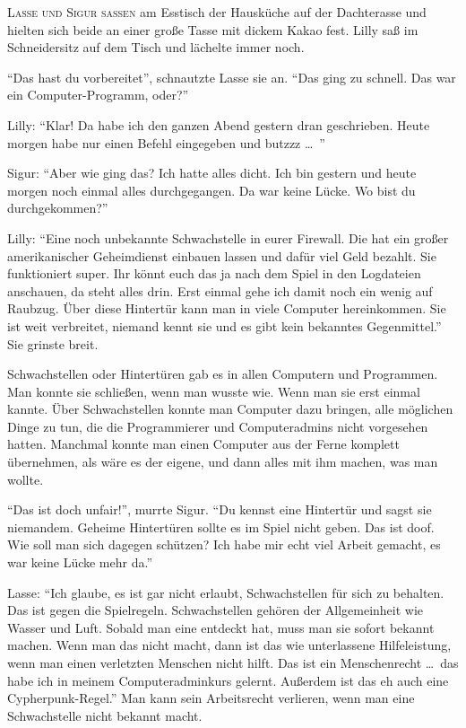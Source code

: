 \label{cha:schwachstellen_in_computern}

\textsc{Lasse und Sigur saßen} am Esstisch der Hausküche auf der Dachterasse und hielten sich beide an einer große Tasse mit dickem Kakao fest.
Lilly saß im Schneidersitz auf dem Tisch und lächelte immer noch.

\enquote{Das hast du vorbereitet}, schnautzte Lasse sie an.
\enquote{Das ging zu schnell.
Das war ein Computer-Programm, oder?}

Lilly: \enquote{Klar! Da habe ich den ganzen Abend gestern dran geschrieben.
Heute morgen habe nur einen Befehl eingegeben und butzzz \dots\ }

Sigur: \enquote{Aber wie ging das?
Ich hatte alles dicht.
Ich bin gestern und heute morgen noch einmal alles durchgegangen.
Da war keine Lücke.
Wo bist du durchgekommen?}

Lilly: \enquote{Eine noch unbekannte Schwachstelle in eurer Firewall.
Die hat ein großer amerikanischer Geheimdienst einbauen lassen und dafür viel Geld bezahlt.
Sie funktioniert super.
Ihr könnt euch das ja nach dem Spiel in den Logdateien anschauen, da steht alles drin.
Erst einmal gehe ich damit noch ein wenig auf Raubzug.
Über diese Hintertür kann man in viele Computer hereinkommen.
Sie ist weit verbreitet, niemand kennt sie und es gibt kein bekanntes Gegenmittel.}
Sie grinste breit.

Schwachstellen oder Hintertüren gab es in allen Computern und Programmen.
Man konnte sie schließen, wenn man wusste wie.
Wenn man sie erst einmal kannte.
Über Schwachstellen konnte man Computer dazu bringen, alle möglichen Dinge zu tun, die die Programmierer und Computeradmins nicht vorgesehen hatten.
Manchmal konnte man einen Computer aus der Ferne komplett übernehmen, als wäre es der eigene, und dann alles mit ihm machen, was man wollte.

\enquote{Das ist doch unfair!}, murrte Sigur.
\enquote{Du kennst eine Hintertür und sagst sie niemandem.
Geheime Hintertüren sollte es im Spiel nicht geben.
Das ist doof.
Wie soll man sich dagegen schützen?
Ich habe mir echt viel Arbeit gemacht, es war keine Lücke mehr da.}

Lasse: \enquote{Ich glaube, es ist gar nicht erlaubt, Schwachstellen für sich zu behalten.
Das ist gegen die Spielregeln.
Schwachstellen gehören der Allgemeinheit wie Wasser und Luft.
Sobald man eine entdeckt hat, muss man sie sofort bekannt machen.
Wenn man das nicht macht, dann ist das wie unterlassene Hilfeleistung, wenn man einen verletzten Menschen nicht hilft.
Das ist ein Menschenrecht \dots\  das habe ich in meinem Computeradminkurs gelernt.
Außerdem ist das eh auch eine Cypherpunk-Regel.}
Man kann sein Arbeitsrecht verlieren, wenn man eine Schwachstelle nicht bekannt macht.

